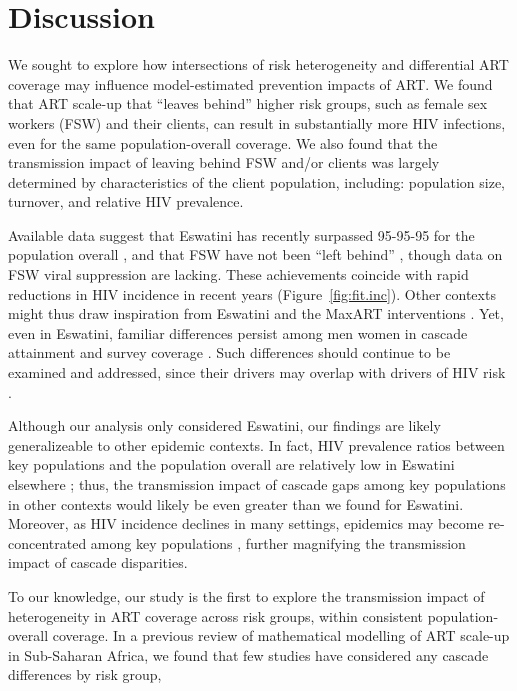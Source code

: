 \section{Discussion}\label{art.disc}
We sought to explore how intersections of risk heterogeneity and differential ART coverage
may influence model-estimated prevention impacts of ART.
We found that ART scale-up that ``leaves behind'' higher risk groups,
such as female sex workers (FSW) and their clients,
can result in substantially more HIV infections,
even for the same population-overall coverage.
We also found that the transmission impact of
leaving behind FSW and/or clients was largely determined by
characteristics of the client population, including:
population size, turnover, and relative HIV prevalence.
\par
Available data suggest that
Eswatini has recently surpassed 95-95-95 for the population overall \cite{SHIMS3},
and that FSW have not been ``left behind'' \cite{EswIBBS2022},
though data on FSW viral suppression are lacking.
These achievements coincide with rapid reductions in HIV incidence in recent years
\cite{SHIMS1,SHIMS2,SHIMS3} (Figure~\ref{fig:fit.inc}).
Other contexts might thus draw inspiration from
Eswatini and the MaxART interventions \cite{Walsh2020}.
Yet, even in Eswatini, familiar differences persist among men \vs women
in cascade attainment and survey coverage \cite{SHIMS1,SHIMS2,SHIMS3}.
Such differences should continue to be examined and addressed,
since their drivers may overlap with drivers of HIV risk \cite{Akullian2017,Camlin2019}.
\par
Although our analysis only considered Eswatini,
our findings are likely generalizeable to other epidemic contexts.
In fact, HIV prevalence ratios between key populations and the population overall
are relatively low in Eswatini \vs elsewhere \cite{Baral2012,Hessou2019};
thus, the transmission impact of cascade gaps among key populations in other contexts
would likely be even greater than we found for Eswatini.
Moreover, as HIV incidence declines in many settings,
epidemics may become re-concentrated among key populations \cite{Brown2019,Garnett2021},
further magnifying the transmission impact of cascade disparities.
\par
To our knowledge, our study is the first to explore the transmission impact of
heterogeneity in ART coverage across risk groups, within consistent population-overall coverage.
In a previous review of mathematical modelling of ART scale-up in Sub-Saharan Africa,
we found that few studies have considered any cascade differences by risk group,

